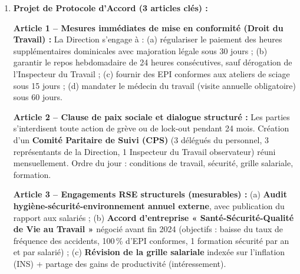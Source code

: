 \documentclass[11pt]{article}
\begin{document}
\begin{corrige}
\begin{enumerate}
    \item \textbf{Projet de Protocole d'Accord (3 articles clés) :}

    \textbf{Article 1 -- Mesures immédiates de mise en conformité (Droit du Travail) :}
    \og La Direction s'engage à : (a) régulariser le paiement des heures supplémentaires dominicales avec majoration légale sous 30 jours ; (b) garantir le repos hebdomadaire de 24 heures consécutives, sauf dérogation de l'Inspecteur du Travail ; (c) fournir des EPI conformes aux ateliers de sciage sous 15 jours ; (d) mandater le médecin du travail (visite annuelle obligatoire) sous 60 jours. \fg

    \textbf{Article 2 -- Clause de paix sociale et dialogue structuré :}
    \og Les parties s'interdisent toute action de grève ou de lock-out pendant 24 mois. Création d'un \textbf{Comité Paritaire de Suivi (CPS)} (3 délégués du personnel, 3 représentants de la Direction, 1 Inspecteur du Travail observateur) réuni mensuellement. Ordre du jour : conditions de travail, sécurité, grille salariale, formation. \fg

    \textbf{Article 3 -- Engagements RSE structurels (mesurables) :}
    \og (a) \textbf{Audit hygiène-sécurité-environnement annuel externe}, avec publication du rapport aux salariés ; (b) \textbf{Accord d'entreprise « Santé-Sécurité-Qualité de Vie au Travail »} négocié avant fin 2024 (objectifs : baisse du taux de fréquence des accidents, 100\,\% d'EPI conformes, 1 formation sécurité par an et par salarié) ; (c) \textbf{Révision de la grille salariale} indexée sur l'inflation (INS) + partage des gains de productivité (intéressement). \fg
\end{enumerate}
\end{corrige}
\end{document}
